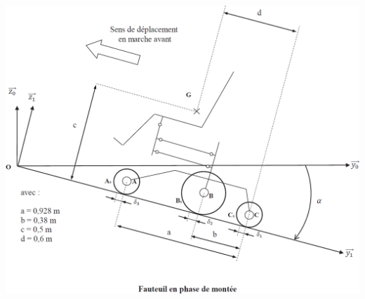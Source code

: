 \documentclass[10pt,fleqn]{article} %
\begin{document}
\begin{center}
\includegraphics[width=.8\linewidth]{images/fig_05}
\end{center}
\end{document}
